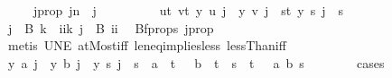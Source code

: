 \begin{isabellebody}
\ \ \ \ \ j{\isacharunderscore}{\kern0pt}prop{\isacharcolon}{\kern0pt}\ {\isachardoublequoteopen}j{\isacharless}{\kern0pt}n{\isachardoublequoteclose}\ \ j\ \isanewline
\ \ \isamarkupfalse%
{\isacharminus}{\kern0pt}\isanewline
\ \ \ \ \isamarkupfalse%
\ {\isachardoublequoteopen}{\isacharparenleft}{\kern0pt}{\isasymforall}u{\isacharless}{\kern0pt}t{\isacharplus}{\kern0pt}{}{\isachardot}{\kern0pt}\ {\isasymforall}v{\isacharless}{\kern0pt}t{\isacharplus}{\kern0pt}{}{\isachardot}{\kern0pt}\ y\ u\ j\ {\isacharequal}{\kern0pt}\ y\ v\ j{\isacharparenright}{\kern0pt}\ {\isasymor}\ {\isacharparenleft}{\kern0pt}{\isasymforall}s{\isacharless}{\kern0pt}t{\isacharplus}{\kern0pt}{}{\isachardot}{\kern0pt}\ y\ s\ j\ {\isacharequal}{\kern0pt}\ s{\isacharparenright}{\kern0pt}{\isachardoublequoteclose}\isanewline
\ \ \ \ \isamarkupfalse%
\ {\isacharminus}{\kern0pt}\isanewline
\ \ \ \ \ \ \isamarkupfalse%
\ {\isachardoublequoteopen}j\ {\isasymin}\ B\ k{\isachardoublequoteclose}\ {\isacharbar}{\kern0pt}\ {\isachardoublequoteopen}{\isasymexists}ii{\isacharless}{\kern0pt}k{\isachardot}{\kern0pt}\ j\ {\isasymin}\ B\ ii{\isachardoublequoteclose}\ \isamarkupfalse%
\ Bf{\isacharunderscore}{\kern0pt}props{\isacharparenleft}{\kern0pt}{}{\isacharparenright}{\kern0pt}\ j{\isacharunderscore}{\kern0pt}prop\ \isanewline
\ \ \ \ \ \ \ \ \isamarkupfalse%
\ {\isacharparenleft}{\kern0pt}metis\ UN{\isacharunderscore}{\kern0pt}E\ atMost{\isacharunderscore}{\kern0pt}iff\ le{\isacharunderscore}{\kern0pt}neq{\isacharunderscore}{\kern0pt}implies{\isacharunderscore}{\kern0pt}less\ lessThan{\isacharunderscore}{\kern0pt}iff{\isacharparenright}{\kern0pt}\isanewline
\ \ \ \ \ \ \isamarkupfalse%
\ \isamarkupfalse%
\ {\isachardoublequoteopen}y\ a\ j\ {\isacharequal}{\kern0pt}\ y\ b\ j\ {\isasymor}\ y\ s\ j\ {\isacharequal}{\kern0pt}\ s{\isachardoublequoteclose}\ \ {\isachardoublequoteopen}a\ {\isacharless}{\kern0pt}\ t\ {\isacharplus}{\kern0pt}\ {}{\isachardoublequoteclose}\ {\isachardoublequoteopen}b\ {\isacharless}{\kern0pt}\ t\ {\isacharplus}{\kern0pt}{}{\isachardoublequoteclose}\ {\isachardoublequoteopen}s\ {\isacharless}{\kern0pt}\ t\ {\isacharplus}{\kern0pt}{}{\isachardoublequoteclose}\ \ a\ b\ s\isanewline
\ \ \ \ \ \ \isamarkupfalse%
\ cases\isanewline
\ \ \ \ \ \ \ \ \isamarkupfalse%

\end{isabellebody}
